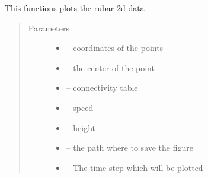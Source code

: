\documentclass[letterpaper,10pt,english]{sphinxmanual}
\begin{document}

\begin{fulllineitems}
\label{\detokenize{index:src.rubar.figure_rubar2d}}
This functions plots the rubar 2d data
\begin{quote}\begin{description}
\item[{Parameters}] \leavevmode\begin{itemize}
\item {} 
 -- coordinates of the points

\item {} 
 -- the center of the point

\item {} 
 -- connectivity table

\item {} 
 -- speed

\item {} 
 -- height

\item {} 
 -- the path where to save the figure

\item {} 
 -- The time step which will be plotted

\end{itemize}

\end{description}\end{quote}

\end{fulllineitems}

\end{document}
